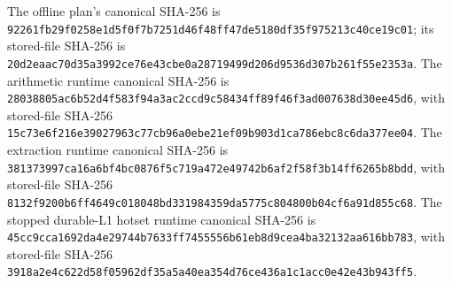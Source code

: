 The offline plan's canonical SHA-256 is
\texttt{92261fb29f0258e1d5f0f7b7251d46f48ff47de5180df35f975213c40ce19c01};
its stored-file SHA-256 is
\texttt{20d2eaac70d35a3992ce76e43cbe0a28719499d206d9536d307b261f55e2353a}.
The arithmetic runtime canonical SHA-256 is
\texttt{28038805ac6b52d4f583f94a3ac2ccd9c58434ff89f46f3ad007638d30ee45d6},
with stored-file SHA-256
\texttt{15c73e6f216e39027963c77cb96a0ebe21ef09b903d1ca786ebc8c6da377ee04}.
The extraction runtime canonical SHA-256 is
\texttt{381373997ca16a6bf4bc0876f5c719a472e49742b6af2f58f3b14ff6265b8bdd},
with stored-file SHA-256
\texttt{8132f9200b6ff4649c018048bd331984359da5775c804800b04cf6a91d855c68}.
The stopped durable-L1 hotset runtime canonical SHA-256 is
\texttt{45cc9cca1692da4e29744b7633ff7455556b61eb8d9cea4ba32132aa616bb783},
with stored-file SHA-256
\texttt{3918a2e4c622d58f05962df35a5a40ea354d76ce436a1c1acc0e42e43b943ff5}.
